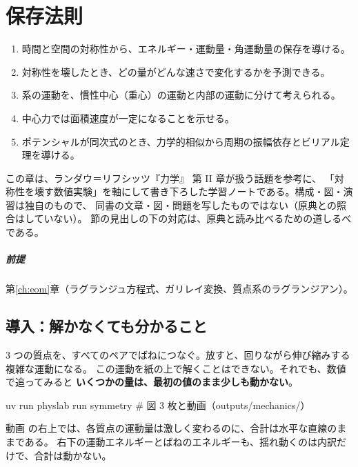 \chapter{保存法則}\label{ch:cons}

\begin{objectives}
\begin{enumerate}
  \item 時間と空間の対称性から、エネルギー・運動量・角運動量の保存を導ける。
  \item 対称性を壊したとき、どの量がどんな速さで変化するかを予測できる。
  \item 系の運動を、慣性中心（重心）の運動と内部の運動に分けて考えられる。
  \item 中心力では面積速度が一定になることを示せる。
  \item ポテンシャルが同次式のとき、力学的相似から周期の振幅依存とビリアル定理を導ける。
\end{enumerate}
\end{objectives}

\begin{note}
この章は、ランダウ＝リフシッツ『力学』\cite{ll-mech} 第 II 章が扱う話題を参考に、
「対称性を壊す数値実験」を軸にして書き下ろした学習ノートである。構成・図・演習は独自のもので、
同書の文章・図・問題を写したものではない（原典との照合はしていない）。
節の見出しの下の対応は、原典と読み比べるための道しるべである。
\end{note}

\paragraph{前提}
第\ref{ch:eom}章（ラグランジュ方程式、ガリレイ変換、質点系のラグランジアン）。

\section{導入：解かなくても分かること}\label{sec:cons-intro}

3 つの質点を、すべてのペアでばねにつなぐ。放すと、回りながら伸び縮みする複雑な運動になる。
この運動を紙の上で解くことはできない。それでも、数値で追ってみると
\textbf{いくつかの量は、最初の値のまま少しも動かない}。

\begin{simbox}
\begin{terminal}
uv run physlab run symmetry      # 図 3 枚と動画（outputs/mechanics/）
\end{terminal}
動画  の右上では、各質点の運動量は激しく変わるのに、合計は水平な直線のままである。
右下の運動エネルギーとばねのエネルギーも、揺れ動くのは内訳だけで、合計は動かない。
\end{simbox}

